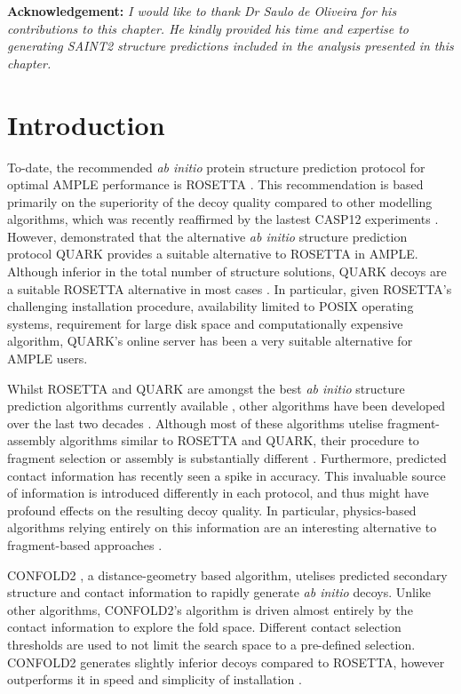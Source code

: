 \textbf{Acknowledgement: }\textit{I would like to thank Dr Saulo de Oliveira for his contributions to this chapter. He kindly provided his time and expertise to generating SAINT2 structure predictions included in the analysis presented in this chapter.}

\section{Introduction}
To-date, the recommended \textit{ab initio} protein structure prediction protocol for optimal AMPLE performance is ROSETTA \cite{Keegan2015-zb, Thomas2017-sh, Thomas2015-wu, Bibby2012-lm}. This recommendation is based primarily on the superiority of the decoy quality compared to other modelling algorithms, which was recently reaffirmed by the lastest CASP12 experiments \cite{Abriata2018-lu,Ovchinnikov2017-wp}. However, \textcite{Keegan2015-zb} demonstrated that the alternative \textit{ab initio} structure prediction protocol QUARK provides a suitable alternative to ROSETTA in AMPLE. Although inferior in the total number of structure solutions, QUARK decoys are a suitable ROSETTA alternative in most cases \cite{Keegan2015-zb}. In particular, given ROSETTA's challenging installation procedure, availability limited to POSIX operating systems, requirement for large disk space and computationally expensive algorithm, QUARK's online server has been a very suitable alternative for AMPLE users.

Whilst ROSETTA and QUARK are amongst the best \textit{ab initio} structure prediction algorithms currently available \cite{Abriata2018-lu}, other algorithms have been developed over the last two decades \cite[e.g.,][]{Jones2001-mc,Ellis2010-zs,Adhikari2015-lb,Xu2012-jf,Marks2011-os,Wang2016-ar}. Although most of these algorithms utelise fragment-assembly algorithms similar to ROSETTA and QUARK, their procedure to fragment selection or assembly is substantially different \cite{Ellis2010-zs,Jones2001-mc}. Furthermore, predicted contact information has recently seen a spike in accuracy. This invaluable source of information is introduced differently in each protocol, and thus might have profound effects on the resulting decoy quality. In particular, physics-based algorithms relying entirely on this information are an interesting alternative to fragment-based approaches \cite{Adhikari2015-lb,Marks2011-os,Wang2016-ar}.

CONFOLD2 \cite{Adhikari2018-lj}, a distance-geometry based algorithm, utelises predicted secondary structure and contact information to rapidly generate \textit{ab initio} decoys. Unlike other algorithms, CONFOLD2's algorithm is driven almost entirely by the contact information to explore the fold space. Different contact selection thresholds are used to not limit the search space to a pre-defined selection. CONFOLD2 generates slightly inferior decoys compared to ROSETTA, however outperforms it in speed and simplicity of installation \cite{Adhikari2018-lj,Michel2017-xh}.


